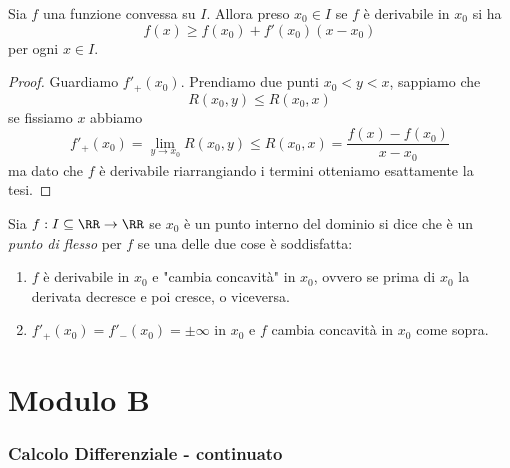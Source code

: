 \documentclass[11pt]{scrartcl}
\begin{document}
	\begin{proposition}
		Sia $f$ una funzione convessa su $I$. Allora preso $x_0\in I$ se $f$ è derivabile in $x_0$ si ha 
		$$f(x)\ge f(x_0)+f'(x_0)(x-x_0)$$
		per ogni $x\in I$.
	\end{proposition}
	\begin{proof}
		Guardiamo $f'_+(x_0)$. Prendiamo due punti $x_0<y<x$, sappiamo che
		$$R(x_0,y)\le R(x_0,x)$$
		se fissiamo $x$ abbiamo
		$$f'_+(x_0)=\lim_{y\to x_0}R(x_0,y)\le R(x_0,x)=\frac{f(x)-f(x_0)}{x-x_0}$$
		ma dato che $f$ è derivabile riarrangiando i termini otteniamo esattamente la tesi.
	\end{proof}
	\begin{definition}
		Sia $f:I\subseteq\RR\to\RR$ se $x_0$ è un punto interno del dominio si dice che è un \textit{punto di flesso} per $f$ se una delle due cose è soddisfatta:
		\begin{enumerate}
			\item $f$ è derivabile in $x_0$ e "cambia concavità" in $x_0$, ovvero se prima di $x_0$ la derivata decresce e poi cresce, o viceversa.
			\item $f'_+(x_0)=f'_-(x_0)=\pm\infty$ in $x_0$ e $f$ cambia concavità in $x_0$ come sopra.
		\end{enumerate}
	\end{definition}
	 
	\newpage 
	
	\part{Modulo B}
	
	\section{Calcolo Differenziale - continuato}
	
\end{document}
